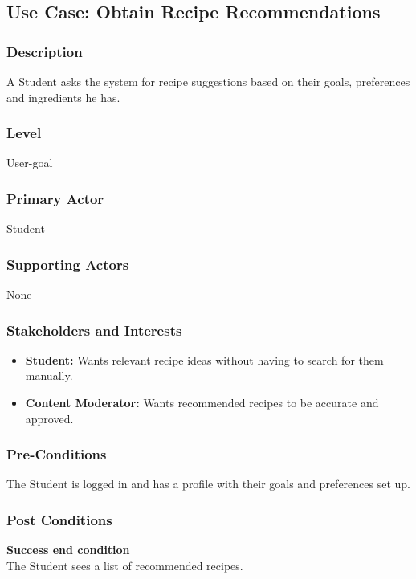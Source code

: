 \documentclass[10pt,letterpaper]{article}
\begin{document}
\subsection*{Use Case: Obtain Recipe Recommendations}

\subsubsection*{Description}
A Student asks the system for recipe suggestions based on their goals, preferences and ingredients he has.

\subsubsection*{Level}
User-goal

\subsubsection*{Primary Actor}
Student

\subsubsection*{Supporting Actors}
None

\subsubsection*{Stakeholders and Interests}
\begin{itemize}
    \item \textbf{Student:} Wants relevant recipe ideas without having to search for them manually.
    \item \textbf{Content Moderator:} Wants recommended recipes to be accurate and approved.
\end{itemize}

\subsubsection*{Pre-Conditions}
The Student is logged in and has a profile with their goals and preferences set up.

\subsubsection*{Post Conditions}

\textbf{Success end condition}\\
The Student sees a list of recommended recipes.
\end{document}
